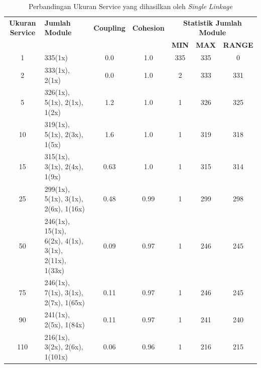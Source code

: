 \begingroup
\setlength{\LTleft}{-20cm plus -1fill}
\setlength{\LTright}{\LTleft}
\begin{small}
\begin{longtable}{|c|p{4cm}|c|c|c|c|c|}
	\caption{Perbandingan Ukuran Service yang dihasilkan oleh \textit{Single} \textit{Linkage}}
	\label{tab:service_stat_single} \\
	\hline
	\textbf{Ukuran Service} & \textbf{Jumlah Module} & \textbf{Coupling} & \textbf{Cohesion} & \multicolumn{3}{c|}{\textbf{Statistik Jumlah Module}} \\
	\cline{5-7}
	&  &  &  & \textbf{MIN} & \textbf{MAX} & \textbf{RANGE} \\
	\hline
	\endfirsthead
	\hline  
	1 & 335(1x) & \cellcolor{colorGood}  0.0 & \cellcolor{colorGood} 1.0 & 335 & 335 & \cellcolor{colorGood} 0 \\   \hline
2 & 333(1x), 2(1x) & \cellcolor{colorGood}  0.0 & \cellcolor{colorGood} 1.0 & 2 & 333 & \cellcolor{colorBad} 331 \\   \hline
5 & 326(1x), 5(1x), 2(1x), 1(2x) & \cellcolor{colorBad}  1.2 & \cellcolor{colorBad} 1.0 & 1 & 326 & \cellcolor{colorBad} 325 \\   \hline
10 & 319(1x), 5(1x), 2(3x), 1(5x) & \cellcolor{colorBad}  1.6 & \cellcolor{colorBad} 1.0 & 1 & 319 & \cellcolor{colorBad} 318 \\   \hline
15 & 315(1x), 3(1x), 2(4x), 1(9x) & \cellcolor{colorGood}  0.63 & \cellcolor{colorGood} 1.0 & 1 & 315 & \cellcolor{colorBad} 314 \\   \hline
25 & 299(1x), 5(1x), 3(1x), 2(6x), 1(16x) & \cellcolor{colorGood}  0.48 & \cellcolor{colorGood} 0.99 & 1 & 299 & \cellcolor{colorBad} 298 \\   \hline
50 & 246(1x), 15(1x), 6(2x), 4(1x), 3(1x), 2(11x), 1(33x) & \cellcolor{colorGood}  0.09 & \cellcolor{colorGood} 0.97 & 1 & 246 & \cellcolor{colorBad} 245 \\   \hline
75 & 246(1x), 7(1x), 3(1x), 2(7x), 1(65x) & \cellcolor{colorGood}  0.11 & \cellcolor{colorGood} 0.97 & 1 & 246 & \cellcolor{colorBad} 245 \\   \hline
90 & 241(1x), 2(5x), 1(84x) & \cellcolor{colorGood}  0.11 & \cellcolor{colorGood} 0.97 & 1 & 241 & \cellcolor{colorBad} 240 \\   \hline
110 & 216(1x), 3(2x), 2(6x), 1(101x) & \cellcolor{colorGood}  0.06 & \cellcolor{colorGood} 0.96 & 1 & 216 & \cellcolor{colorBad} 215 \\   \hline

\end{longtable}
\end{small}
